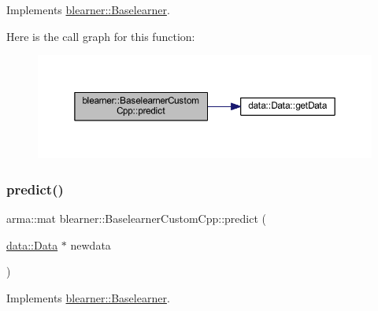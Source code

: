 Implements \mbox{\hyperlink{classblearner_1_1_baselearner_ab37986047db43c84420fef2cef7fc20d}{blearner\+::\+Baselearner}}.

Here is the call graph for this function\+:
\nopagebreak
\begin{figure}[H]
\begin{center}
\leavevmode
\includegraphics[width=350pt]{classblearner_1_1_baselearner_custom_cpp_a88c17ed1e32255e482f34695e06e7d25_cgraph}
\end{center}
\end{figure}
\mbox{\label{classblearner_1_1_baselearner_custom_cpp_a55fb45a929fea01f79fa3dcad7698174}} 
\subsubsection{\texorpdfstring{predict()}{predict()}\hspace{0.1cm}{\footnotesize\ttfamily [2/2]}}
{\footnotesize\ttfamily arma\+::mat blearner\+::\+Baselearner\+Custom\+Cpp\+::predict (\begin{DoxyParamCaption}\item[{\mbox{\hyperlink{classdata_1_1_data}{data\+::\+Data}} $\ast$}]{newdata }\end{DoxyParamCaption})\hspace{0.3cm}{\ttfamily [virtual]}}



Implements \mbox{\hyperlink{classblearner_1_1_baselearner_ae2ef5e018783578e02b3b5a33fa94eae}{blearner\+::\+Baselearner}}.

